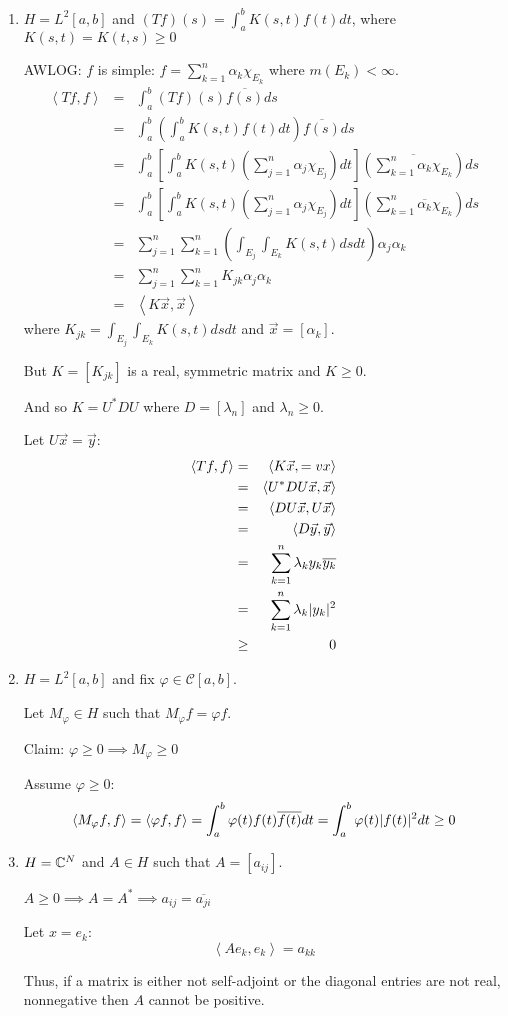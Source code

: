 \documentclass[letterpaper,12pt,fleqn]{article}
\newcommand{\mc}{\mathcal{C}}
\newcommand{\inner}[1]{\left<#1\right>}
\newcommand{\conj}[1]{\overline{#1}}
\newcommand{\vx}{\vec{x}}
\newcommand{\vy}{\vec{y}}
\newcommand{\vp}{\varphi}
\renewcommand{\a}{\alpha}
\renewcommand{\l}{\lambda}
\newcommand{\X}{\chi}
\begin{document}
\begin{examples}
  \listbreak
  \begin{enumerate}
  \item $H=L^2[a,b]$ and $(Tf)(s)=\int_a^bK(s,t)f(t)dt$, where
    $K(s,t)=K(t,s)\ge0$

    AWLOG: $f$ is simple: $f=\sum_{k=1}^n\a_k\X_{E_k}$ where $m(E_k)<\infty$.
    \begin{eqnarray*}
      \inner{Tf,f} &=& \int_a^b(Tf)(s)\conj{f(s)}ds \\
      &=& \int_a^b\left(\int_a^bK(s,t)f(t)dt\right)\conj{f(s)}ds \\
      &=& \int_a^b\left[\int_a^bK(s,t)\left(\sum_{j=1}^n\a_j\X_{E_j}\right)dt
      \right]\left(\conj{\sum_{k=1}^n\a_k\X_{E_k}}\right)ds \\
      &=& \int_a^b\left[\int_a^bK(s,t)\left(\sum_{j=1}^n\a_j\X_{E_j}\right)dt
        \right]\left(\sum_{k=1}^n\conj{\a_k}\X_{E_k}\right)ds \\
      &=& \sum_{j=1}^n\sum_{k=1}^n\left(\int_{E_j}\int_{E_k}K(s,t)dsdt\right)
      \a_j\a_k \\
      &=& \sum_{j=1}^n\sum_{k=1}^nK_{jk}\a_j\a_k \\
      &=& \inner{K\vx,\vx}
    \end{eqnarray*}
    where $K_{jk}=\int_{E_j}\int_{E_k}K(s,t)dsdt$ and $\vx=[\a_k]$.
    
    But $K=[K_{jk}]$ is a real, symmetric matrix and $K\ge0$.

    And so $K=U^*DU$ where $D=[\l_n]$ and $\l_n\ge0$.

    Let $U\vx=\vy$:
    \begin{eqnarray*}
      \inner{Tf,f} &=& \inner{K\vx,=vx} \\
      &=& \inner{U^*DU\vx,\vx} \\
      &=& \inner{DU\vx,U\vx} \\
      &=& \inner{D\vy,\vy} \\
      &=& \sum_{k=1}^n\l_ky_k\conj{y_k} \\
      &=& \sum_{k=1}^n\l_k\abs{y_k}^2 \\
      &\ge& 0
    \end{eqnarray*}

  \item $H=L^2[a,b]$ and fix $\vp\in\mc[a,b]$.

    Let $M_{\vp}\in H$ such that $M_{\vp}f=\vp f$.

    Claim: $\vp\ge0\implies M_{\vp}\ge0$

    Assume $\vp\ge0$:
    \[\inner{M_{\vp}f,f}=\inner{\vp f,f}=\int_a^b\vp(t)f(t)\conj{f(t)}dt=
    \int_a^b\vp(t)\abs{f(t)}^2dt\ge0\]

  \item $H=\mathbb{C}^N$ and $A\in H$ such that $A=[a_{ij}]$.

    $A\ge0\implies A=A^*\implies a_{ij}=\conj{a_{ji}}$

    Let $x=e_k$:
    \[\inner{Ae_k,e_k}=a_{kk}\]

    Thus, if a matrix is either not self-adjoint or the diagonal entries are
    not real, nonnegative then $A$ cannot be positive.
  \end{enumerate}
\end{examples}
\end{document}
